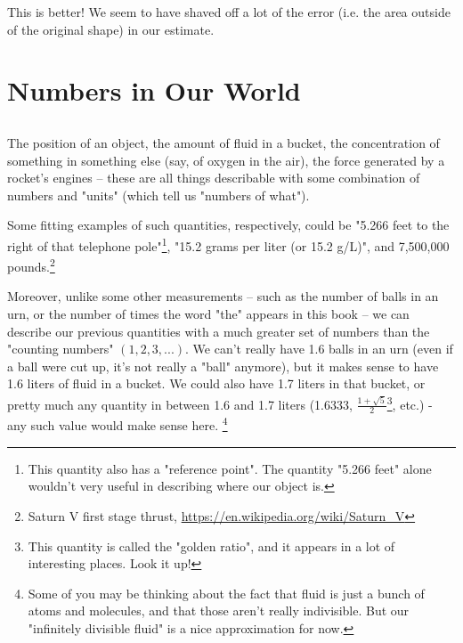 \documentclass{article}
\begin{document}

This is better! We seem to have shaved off a lot of the error (i.e. the area outside of the original shape) in our estimate. 



















\section{Numbers in Our World}

\subsection{}

The position of an object, the amount of fluid in a bucket, the concentration of something in something else (say, of oxygen in the air), the force generated by a rocket's engines -- these are all things describable with some combination of numbers and "units" (which tell us "numbers of what"). 


Some fitting examples of such quantities, respectively, could be "5.266 feet to the right of that telephone pole"\footnote{This quantity also has a "reference point". The quantity "5.266 feet" alone wouldn't very useful in describing where our object is.}, "15.2 grams per liter (or 15.2 g/L)", and 7,500,000 pounds.\footnote{Saturn V first stage thrust, \url{https://en.wikipedia.org/wiki/Saturn_V}}



Moreover, unlike some other measurements -- such as the number of balls in an urn, or the number of times the word "the" appears in this book -- we can describe our previous quantities with a much greater set of numbers than the "counting numbers" $(1, 2, 3, ...)$. We can't really have 1.6 balls in an urn (even if a ball were cut up, it's not really a "ball" anymore), but it makes sense to have 1.6 liters of fluid in a bucket. We could also have 1.7 liters in that bucket, or pretty much any quantity in between 1.6 and 1.7 liters (1.6333, $\frac{1 + \sqrt{5}}{2}$\footnote{This quantity is called the "golden ratio", and it appears in a lot of interesting places. Look it up!}, etc.) - any such value would make sense here. \footnote{Some of you may be thinking about the fact that fluid is just a bunch of atoms and molecules, and that those aren't really indivisible. But our "infinitely divisible fluid" is a nice approximation for now.}
\end{document}
